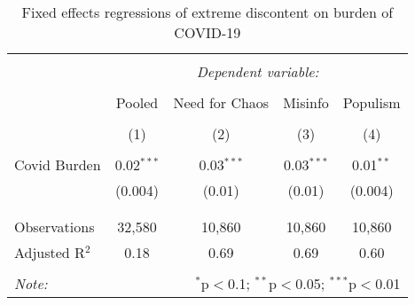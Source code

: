 
\begin{table}[!htbp] \centering 
  \caption{Fixed effects regressions of extreme discontent on burden of COVID-19} 
  \label{tab:extreme_cbs} 
\begin{tabular}{@{\extracolsep{5pt}}lcccc} 
\\[-1.8ex]\hline 
\hline \\[-1.8ex] 
 & \multicolumn{4}{c}{\textit{Dependent variable:}} \\ 
\cline{2-5} 
\\[-1.8ex] & Pooled & Need for Chaos & Misinfo & Populism \\ 
\\[-1.8ex] & (1) & (2) & (3) & (4)\\ 
\hline \\[-1.8ex] 
 Covid Burden & 0.02$^{***}$ & 0.03$^{***}$ & 0.03$^{***}$ & 0.01$^{**}$ \\ 
  & (0.004) & (0.01) & (0.01) & (0.004) \\ 
  & & & & \\ 
\hline \\[-1.8ex] 
Observations & 32,580 & 10,860 & 10,860 & 10,860 \\ 
Adjusted R$^{2}$ & 0.18 & 0.69 & 0.69 & 0.60 \\ 
\hline 
\hline \\[-1.8ex] 
\textit{Note:}  & \multicolumn{4}{r}{$^{*}$p$<$0.1; $^{**}$p$<$0.05; $^{***}$p$<$0.01} \\ 
\end{tabular} 
\end{table} 
